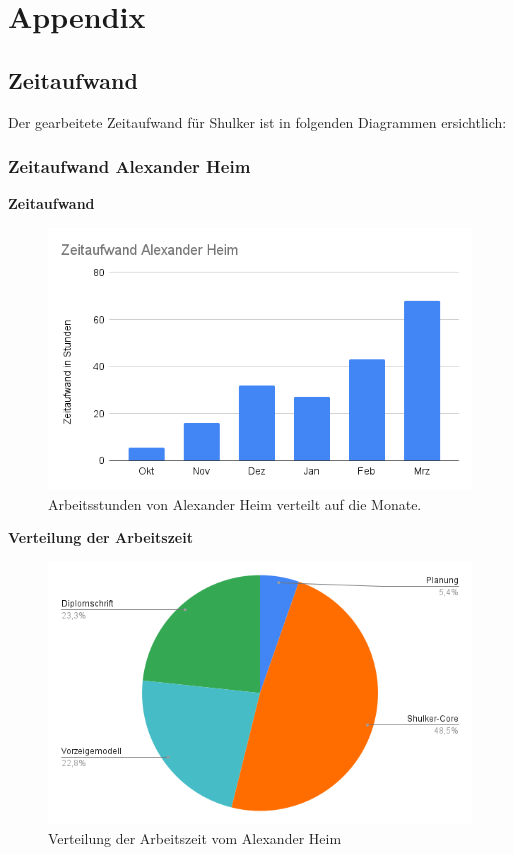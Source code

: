 \chapter{Appendix}
\section{Zeitaufwand}
Der gearbeitete Zeitaufwand für Shulker ist in folgenden Diagrammen ersichtlich:

\subsection{Zeitaufwand Alexander Heim}
\textbf{Zeitaufwand}
\begin{figure}[H]
    \begin{center}
        \includegraphics[width=.75\textwidth]{images/appendix/ZeitaufwandHeim.png}
        \caption{Arbeitsstunden von Alexander Heim verteilt auf die Monate.}
    \end{center}
\end{figure}

\textbf{Verteilung der Arbeitszeit}
\begin{figure}[H]
    \begin{center}
        \includegraphics[width=.75\textwidth]{images/appendix/AufteilungHeim.png}
        \caption{Verteilung der Arbeitszeit vom Alexander Heim}
    \end{center}
\end{figure}

